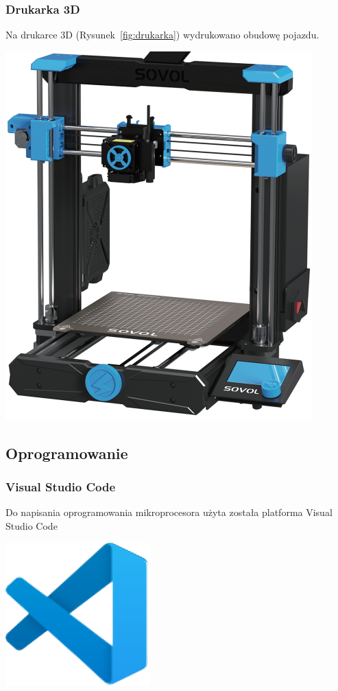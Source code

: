 \subsubsection*{Drukarka 3D}
Na drukarce 3D (Rysunek~\ref{fig:drukarka}) wydrukowano obudowę pojazdu.
\begin{center}
    \includegraphics[scale=0.45]{images/printer.png}
    \label{fig:drukarka}
\end{center}

\subsection*{Oprogramowanie}
\subsubsection*{Visual Studio Code}
Do napisania oprogramowania mikroprocesora użyta została platforma Visual Studio Code
\begin{center}
    \includegraphics[scale=1]{images/vscode.eps}
    \label{fig:drukarka}
\end{center}

